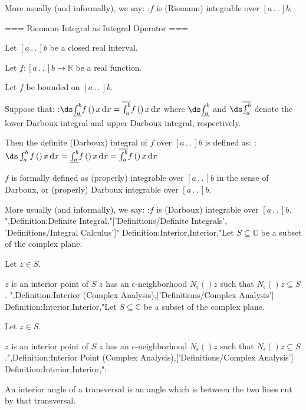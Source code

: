 More usually (and informally), we say:
:$f$ is (Riemann) integrable over $\left[ a \,.\,.\,   \right]b$.


=== Riemann Integral as Integral Operator ===

Let $\left[ a \,.\,.\,   \right]b$ be a closed real interval.

Let $f: \left[ a \,.\,.\,   \right]b \to \mathbb R$ be a real function.

Let $f$ be bounded on $\left[ a \,.\,.\,   \right]b$.


Suppose that:
:$\ds \underline {\int_a^b} f \left(   \right)x \,\mathrm d x = \overline {\int_a^b} f \left(   \right)x \,\mathrm d x$
where $\ds \underline {\int_a^b}$ and $\ds \overline {\int_a^b}$ denote the lower Darboux integral and upper Darboux integral, respectively.


Then the definite (Darboux) integral of $f$ over $\left[ a \,.\,.\,   \right]b$ is defined as:
:$\ds \int_a^b f \left(   \right)x \,\mathrm d x = \underline {\int_a^b} f \left(   \right)x \,\mathrm d x = \overline {\int_a^b} f \left(   \right)x \,\mathrm d x$


$f$ is formally defined as (properly) integrable over $\left[ a \,.\,.\,   \right]b$ in the sense of Darboux, or (properly) Darboux integrable over $\left[ a \,.\,.\,   \right]b$.


More usually (and informally), we say:
:$f$ is (Darboux) integrable over $\left[ a \,.\,.\,   \right]b$.
",Definition:Definite Integral,"['Definitions/Definite Integrals', 'Definitions/Integral Calculus']"
Definition:Interior,Interior,"Let $S \subseteq \mathbb C$ be a subset of the complex plane.

Let $z \in S$.


$z$ is an interior point of $S$  $z$ has an $\epsilon$-neighborhood $N_\epsilon \left(   \right)z$ such that $N_\epsilon \left(   \right)z \subseteq S$.
",Definition:Interior (Complex Analysis),['Definitions/Complex Analysis']
Definition:Interior,Interior,"Let $S \subseteq \mathbb C$ be a subset of the complex plane.

Let $z \in S$.


$z$ is an interior point of $S$  $z$ has an $\epsilon$-neighborhood $N_\epsilon \left(   \right)z$ such that $N_\epsilon \left(   \right)z \subseteq S$.",Definition:Interior Point (Complex Analysis),['Definitions/Complex Analysis']
Definition:Interior,Interior,":


An interior angle of a transversal is an angle which is between the two lines cut by that transversal.

